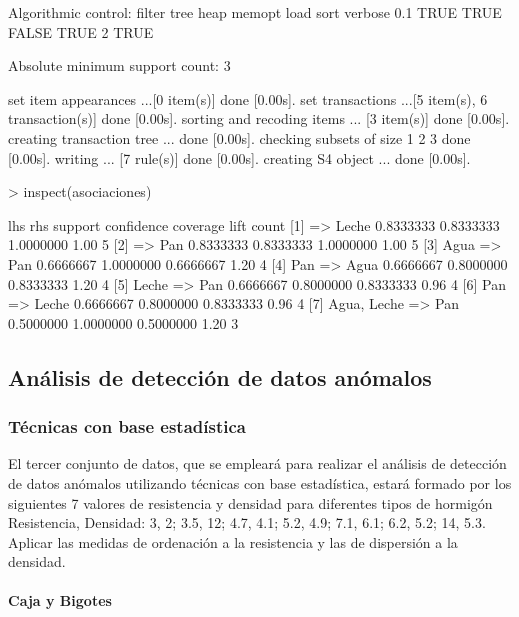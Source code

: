 \documentclass[a4paper, 12pt]{article}
\begin{document}
\begin{Schunk}
\begin{Soutput}
Algorithmic control:
 filter tree heap memopt load sort verbose
    0.1 TRUE TRUE  FALSE TRUE    2    TRUE

Absolute minimum support count: 3 

set item appearances ...[0 item(s)] done [0.00s].
set transactions ...[5 item(s), 6 transaction(s)] done [0.00s].
sorting and recoding items ... [3 item(s)] done [0.00s].
creating transaction tree ... done [0.00s].
checking subsets of size 1 2 3 done [0.00s].
writing ... [7 rule(s)] done [0.00s].
creating S4 object  ... done [0.00s].
\end{Soutput}
\begin{Sinput}
> inspect(asociaciones)
\end{Sinput}
\begin{Soutput}
    lhs              rhs     support   confidence coverage  lift count
[1] {}            => {Leche} 0.8333333 0.8333333  1.0000000 1.00 5    
[2] {}            => {Pan}   0.8333333 0.8333333  1.0000000 1.00 5    
[3] {Agua}        => {Pan}   0.6666667 1.0000000  0.6666667 1.20 4    
[4] {Pan}         => {Agua}  0.6666667 0.8000000  0.8333333 1.20 4    
[5] {Leche}       => {Pan}   0.6666667 0.8000000  0.8333333 0.96 4    
[6] {Pan}         => {Leche} 0.6666667 0.8000000  0.8333333 0.96 4    
[7] {Agua, Leche} => {Pan}   0.5000000 1.0000000  0.5000000 1.20 3    
\end{Soutput}
\end{Schunk}
	\subsection{Análisis de detección de datos anómalos}
	
	\subsubsection{Técnicas con base estadística}
	El tercer conjunto de datos, que se empleará para realizar el análisis de detección de datos anómalos utilizando técnicas con base estadística, estará formado por los siguientes 7 valores de resistencia y densidad para diferentes tipos de hormigón {Resistencia, Densidad}: {3, 2; 3.5, 12; 4.7, 4.1; 5.2, 4.9; 7.1, 6.1; 6.2, 5.2; 14, 5.3}. Aplicar las medidas de ordenación a la resistencia y las de dispersión a la densidad.
	
	\paragraph{Caja y Bigotes}
\end{document}
